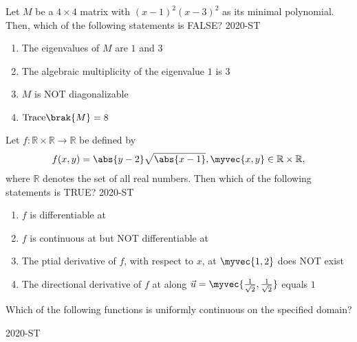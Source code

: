 \item Let  $M$ be a  $4 \times 4$ matrix with  $(x - 1)^2(x - 3)^2$ as its minimal polynomial. Then, which of the following statements is FALSE?
\hfill{2020-ST}
\begin{enumerate}
    \item The eigenvalues of  $M$ are $1$ and $3$
    \item The algebraic multiplicity of the eigenvalue $1$ is $3$
    \item $M$ is NOT diagonalizable
    \item $\text{Trace}\brak{M} = 8$
\end{enumerate}

\item Let $f : \mathbb{R} \times \mathbb{R} \to \mathbb{R}$ be defined by
\begin{align*}
 f(x, y) = \abs{y - 2} \sqrt{\abs{x - 1}}, \myvec{x, y} \in \mathbb{R} \times \mathbb{R},   
\end{align*}
where  $\mathbb{R}$ denotes the set of all real numbers. Then which of the following statements is TRUE?
\hfill{2020-ST}
\begin{enumerate}
    \item $f$ is differentiable at 
    \item $f$ is continuous at  but NOT differentiable at 
    \item The ptial derivative of  $f$, with respect to  $x$, at $\myvec{1,2}$ does NOT exist
    \item The directional derivative of  $f$ at  along  $\vec{u} = \myvec{\frac{1}{\sqrt{2}}, \frac{1}{\sqrt{2}}}$ equals $1$
\end{enumerate}

\item Which of the following functions is uniformly continuous on the 
specified domain? 

\hfill{2020-ST}

